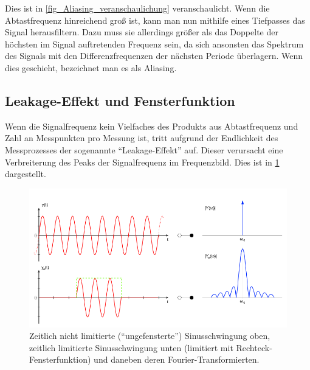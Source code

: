 \documentclass[
a4paper,
12pt,
pagesize,
ngerman
]{scrartcl}
\begin{document}
	\noindent Dies ist in \cref{fig_Aliasing_veranschaulichung} veranschaulicht.
	Wenn die Abtastfrequenz hinreichend groß ist, kann man nun mithilfe eines Tiefpasses das Signal herausfiltern.
	Dazu muss sie allerdings größer als das Doppelte der höchsten im Signal auftretenden Frequenz sein, da sich ansonsten das Spektrum des Signals mit den Differenzfrequenzen der nächsten Periode überlagern.
	Wenn dies geschieht, bezeichnet man es als Aliasing.
		
	
	\subsection{Leakage-Effekt und Fensterfunktion}
	\label{leakage}
	Wenn die Signalfrequenz kein Vielfaches des Produkts aus Abtastfrequenz und Zahl an Messpunkten pro Messung ist, tritt aufgrund der Endlichkeit des Messprozesses der sogenannte \enquote{Leakage-Effekt} auf.
	Dieser verursacht eine Verbreiterung des Peaks der Signalfrequenz im Frequenzbild.
	Dies ist in \cref{fig_leakage_veranschaulichung} dargestellt.
	
	\begin{figure}[H]  
		\includegraphics[width=1\textwidth]{EIRE2018Dateien/sonstige_Dateien/leakage}
		\centering
		\caption{
			Zeitlich nicht limitierte (\enquote{ungefensterte}) Sinusschwingung oben, zeitlich limitierte Sinusschwingung unten (limitiert mit Rechteck-Fensterfunktion) und daneben deren Fourier-Transformierten.\cite{Leakage}
		}
		\label{fig_leakage_veranschaulichung}
		\centering
	\end{figure}
\end{document}
